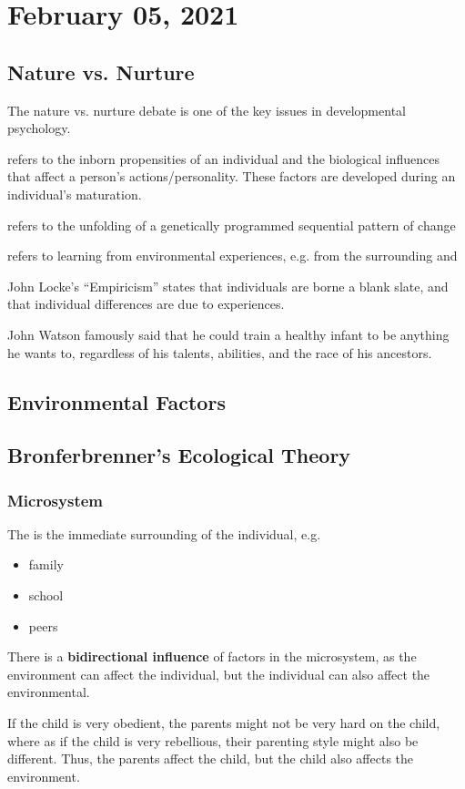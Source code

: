 \documentclass[../main/main.tex]{subfiles}
\begin{document}
\section{February 05, 2021}
\subsection{Nature vs. Nurture}
The nature vs. nurture debate is one of the key issues in developmental psychology.
\begin{definition}
 refers to the inborn propensities of an individual and the biological influences that affect a person's actions/personality. These factors are developed during an individual's maturation.
\end{definition}
\begin{definition}
 refers to the unfolding of a genetically programmed sequential pattern of change
\end{definition}
\begin{definition}
 refers to learning from environmental experiences, e.g. from the surrounding and
\end{definition}
\begin{example}
John Locke’s “Empiricism” states that individuals are borne a blank slate, and that individual differences are due to experiences.
\end{example}
\begin{example}
John Watson famously said that he could train a healthy infant to be anything he wants to, regardless of his talents, abilities, and the race of his ancestors.
\end{example}
\subsection{Environmental Factors}
\subsection{Bronferbrenner's Ecological Theory}
\subsubsection{Microsystem} 
The  is the immediate surrounding of the individual, e.g.
\begin{itemize}
\item family
\item school
\item peers
\end{itemize}
There is a \textbf{bidirectional influence} of factors in the microsystem, as the environment can affect the individual, but the individual can also affect the environmental.
\begin{example}
If the child is very obedient, the parents might not be very hard on the child, where as if the child is very rebellious, their parenting style might also be different. Thus, the parents affect the child, but the child also affects the environment.
\end{example}
\end{document}
